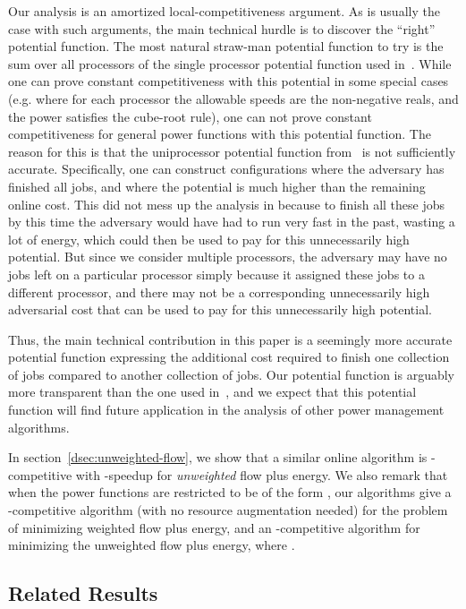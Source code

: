 \documentclass[11pt]{article}
\begin{document}
Our analysis is an amortized local-competitiveness argument. As is
usually the case with such arguments, the main technical hurdle is to
discover the ``right'' potential function. The most natural straw-man potential function to try is the sum over all
processors of the single processor potential function used
in~\cite{BCP}.  While one can prove constant competitiveness with this
potential in some special cases (e.g. where for each processor the
allowable speeds are the non-negative reals, and the power satisfies the
cube-root rule), one can not prove constant competitiveness for general
power functions with this potential function.  The reason for this is
that the uniprocessor potential function from~\cite{BCP} is not
sufficiently accurate.  Specifically, one can construct
configurations where the adversary has finished all jobs, and where the
potential is much higher than the remaining online cost. This did not
mess up the analysis in \cite{BCP} because to finish all these jobs by
this time the adversary would have had to run very fast in the past,
wasting a lot of energy, which could then be used to pay for this
unnecessarily high potential.  But since we consider multiple
processors, the adversary may have no jobs left on a particular
processor simply because it assigned these jobs to a different
processor, and there may not be a corresponding unnecessarily high
adversarial cost that can be used to pay for this unnecessarily high
potential. 

Thus, the main technical contribution in this paper is a seemingly
more accurate potential function expressing the additional cost required
to finish one collection of jobs compared to another collection of
jobs. Our potential function is arguably more transparent than the one used in~\cite{BCP},
and we expect that
this potential function will find future application in
the analysis of other power management algorithms.


In section~\ref{dsec:unweighted-flow}, we show that a similar online algorithm is
-competitive with -speedup for
\emph{unweighted} flow plus energy.
We also remark that when the power functions  are
restricted to be of the form , our algorithms give a
-competitive algorithm (with no resource augmentation needed) for the problem of minimizing weighted flow plus energy, and an
-competitive algorithm for minimizing the unweighted flow plus energy,
where .





\subsection{Related Results}
\label{sec:related-results}
\end{document}
